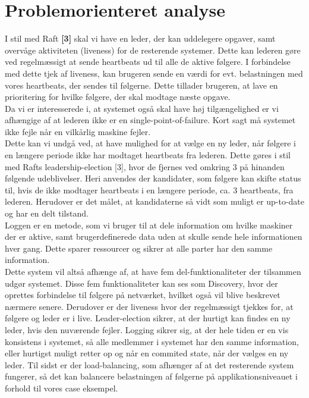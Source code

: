 \documentclass[a4paper,12pt]{article}
\begin{document}
\section{Problemorienteret analyse}
I stil med Raft \textbf{[3]} skal vi have en leder, der kan uddelegere opgaver, samt overvåge aktiviteten (liveness) for de resterende systemer. Dette kan lederen gøre ved regelmæssigt at sende heartbeats ud til alle de aktive følgere. I forbindelse med dette tjek af liveness, kan brugeren sende en værdi for evt. belastningen med vores heartbeats, der sendes til følgerne. Dette tillader brugeren, at lave en prioritering for hvilke følgere, der skal modtage næste opgave.
\\
Da vi er interesserede i, at systemet også skal have høj tilgængelighed er vi afhængige af at lederen ikke er en single-point-of-failure. Kort sagt må systemet ikke fejle når en vilkårlig maskine fejler.
\\[5px]
Dette kan vi undgå ved, at have mulighed for at vælge en ny leder, når følgere i en længere periode ikke har modtaget heartbeats fra lederen. Dette gøres i stil med Rafts leadership-election [3], hvor de fjernes ved omkring 3 på hinanden følgende udeblivelser. Heri anvendes der kandidater, som følgere kan skifte status til, hvis de ikke modtager heartbeats i en længere periode, ca. 3 heartbeats, fra lederen. Herudover er det målet, at kandidaterne så vidt som muligt er up-to-date og har en delt tilstand. 
\\
Loggen er en metode, som vi bruger til at dele information om hvilke maskiner der er aktive, samt brugerdefinerede data uden at skulle sende hele informationen hver gang. Dette sparer ressourcer og sikrer at alle parter har den samme information.
\\[5px]
Dette system vil altså afhænge af, at have fem del-funktionaliteter der tilsammen udgør systemet. Disse fem funktionaliteter kan ses som Discovery, hvor der oprettes forbindelse til følgere på netværket, hvilket også vil blive beskrevet nærmere senere. Derudover er der liveness hvor der regelmæssigt tjekkes for, at følgere og leder er i live. Leader-election sikrer, at der hurtigt kan findes en ny leder, hvis den nuværende fejler. Logging sikrer sig, at der hele tiden er en vis konsistens i systemet, så alle medlemmer i systemet har den samme information, eller hurtigst muligt retter op og når en commited state, når der vælges en ny leder. Til sidst er der load-balancing, som afhænger af at det resterende system fungerer, så det kan balancere belastningen af følgerne på applikationsniveauet i forhold til vores case eksempel.
\end{document}
